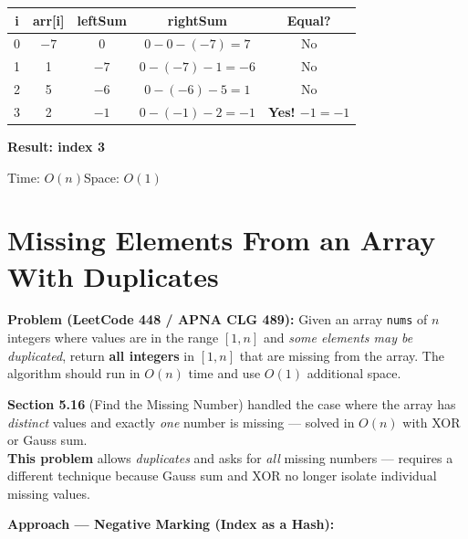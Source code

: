 \documentclass[12pt,a4paper,oneside]{book}
\begin{document}
\begin{dryrun}[Dry Run: arr = \{$-7$, 1, 5, 2, $-4$, 3, 0\}, totalSum = 0]
\begin{center}
\begin{tabular}{ccccc}
\toprule
\textbf{i} & \textbf{arr[i]} & \textbf{leftSum} & \textbf{rightSum} & \textbf{Equal?}\\
\midrule
0 & $-7$ & 0    & $0-0-(-7)=7$   & No\\
1 & 1    & $-7$ & $0-(-7)-1=-6$  & No\\
2 & 5    & $-6$ & $0-(-6)-5=1$   & No\\
3 & 2    & $-1$ & $0-(-1)-2=-1$  & \textbf{Yes! $-1 = -1$}\\
\bottomrule
\end{tabular}
\end{center}
\textbf{Result: index 3}
\end{dryrun}

\begin{complexity}
Time: $O(n)$\quad Space: $O(1)$
\end{complexity}

\section{Missing Elements From an Array With Duplicates}

\textbf{Problem (LeetCode 448 / APNA CLG 489):} Given an array \texttt{nums} of $n$ integers where values are in the range $[1, n]$ and \textit{some elements may be duplicated}, return \textbf{all integers} in $[1, n]$ that are missing from the array. The algorithm should run in $O(n)$ time and use $O(1)$ additional space.

\begin{warningbox}
\textbf{Section 5.16} (Find the Missing Number) handled the case where the array has \textit{distinct} values and exactly \textit{one} number is missing --- solved in $O(n)$ with XOR or Gauss sum.\\[4pt]
\textbf{This problem} allows \textit{duplicates} and asks for \textit{all} missing numbers --- requires a different technique because Gauss sum and XOR no longer isolate individual missing values.
\end{warningbox}

\textbf{Approach --- Negative Marking (Index as a Hash):}
\end{document}
